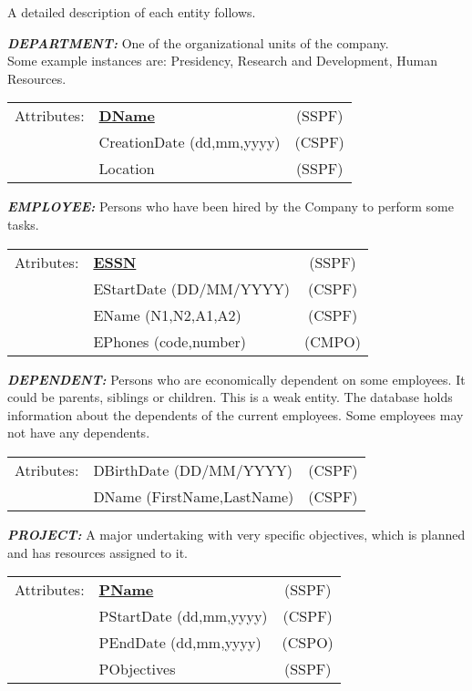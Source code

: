 \documentclass[11pt]{article}
\begin{document}
\noindent
A detailed description of each entity follows.
\begin{description}
\item{\em\bf DEPARTMENT:} One of the organizational units of the company. \\
Some example instances are: Presidency, Research and Development, Human Resources.
 
\begin{tabular}{llc}
 Attributes: & {\bf \underline{DName}} &  (SSPF)\\
	    & CreationDate (dd,mm,yyyy) &  (CSPF) \\
	    & Location &  (SSPF)\\
\end{tabular}

\item{\em\bf EMPLOYEE:} Persons who have been hired by the Company to perform some tasks.

\begin{tabular}{llc}
 Atributes: & {\bf \underline{ESSN}} & (SSPF) \\
            & EStartDate (DD/MM/YYYY) & (CSPF) \\
            & EName (N1,N2,A1,A2) & (CSPF) \\
            & EPhones (code,number) & (CMPO)
\end{tabular}

\item{\em\bf DEPENDENT:} Persons who are economically dependent on some employees. It could be parents, siblings or children. This is a weak entity. The database holds information about the dependents of the current employees. Some employees may not have any dependents.

\begin{tabular}{llc}
 Atributes:  & DBirthDate (DD/MM/YYYY) & (CSPF) \\
            & DName (FirstName,LastName) & (CSPF) 
\end{tabular}

\item{\em\bf PROJECT:} A major undertaking with very specific objectives, which is planned and has resources assigned to it.

\begin{tabular}{llc}
 Attributes: & {\bf \underline{PName}} &  (SSPF)\\
	    & PStartDate (dd,mm,yyyy) &  (CSPF) \\
	    & PEndDate (dd,mm,yyyy) &  (CSPO) \\
	    & PObjectives &  (SSPF)\\
\end{tabular}
\end{description}
\end{document}
